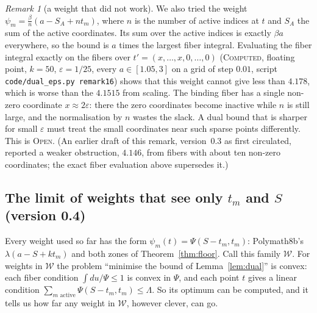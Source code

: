 \documentclass[11pt]{amsart}
\theoremstyle{definition}
\theoremstyle{remark}
\newtheorem{remark}[theorem]{Remark}
\newcommand{\lbl}[1]{\textup{\textsc{#1}}}
\begin{document}
\begin{remark}[a weight that did not work]
We also tried the weight $\psi_m=\frac{\beta}{n}(a-S_A+nt_m)$, where $n$ is
the number of active indices at $t$ and $S_A$ the sum of the active
coordinates. Its sum over the active indices is exactly $\beta a$ everywhere,
so the bound is $a$ times the largest fiber integral. Evaluating the fiber
integral exactly on the fibers over $t'=(x,\dots,x,0,\dots,0)$ (\lbl{Computed},
floating point, $k=50$, $\varepsilon=1/25$, every $a\in[1.05,3]$ on a grid of
step $0.01$, script \texttt{code/dual\_eps.py remark16}) shows that this
weight cannot give less than $4.178$, which is worse than the $4.1515$ from
scaling. The binding fiber has a single non-zero coordinate $x\approx2\varepsilon$:
there the zero coordinates become inactive while $n$ is still large, and the
normalisation by $n$ wastes the slack. A dual bound that is sharper for small
$\varepsilon$ must treat the small coordinates near such sparse points
differently. This is \lbl{Open}. (An earlier draft of this remark, version~0.3
as first circulated, reported a weaker obstruction, $4.146$, from fibers with
about ten non-zero coordinates; the exact fiber evaluation above supersedes it.)
\end{remark}

\subsection*{The limit of weights that see only \texorpdfstring{$t_m$}{t\_m} and \texorpdfstring{$S$}{S} (version 0.4)}
Every weight used so far has the form
$\psi_m(t)=\Psi(S-t_m,t_m)$: Polymath8b's $\lambda(a-S+kt_m)$ and both zones of
Theorem~\ref{thm:floor}. Call this family $\mathcal W$. For weights in
$\mathcal W$ the problem ``minimise the bound of Lemma~\ref{lem:dual}'' is
convex: each fiber condition $\int du/\Psi\le1$ is convex in $\Psi$, and each
point $t$ gives a linear condition $\sum_{m\text{ active}}\Psi(S-t_m,t_m)\le\Lambda$.
So its optimum can be computed, and it tells us how far any weight in
$\mathcal W$, however clever, can go.
\end{document}
